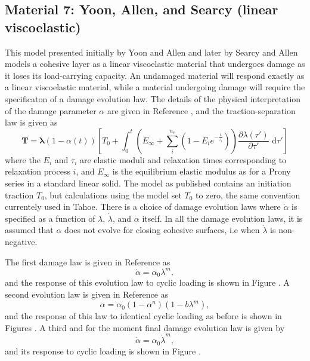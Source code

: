 \subsection{Material 7: Yoon, Allen, and Searcy (linear viscoelastic)}
\label{sect.material.surface.yoon}
This model presented initially by Yoon and Allen and later by
Searcy and Allen models a cohesive layer as a linear viscoelastic material
that undergoes damage as it loses its load-carrying capacity. An undamaged
material will respond exactly as a linear viscoelastic material, while
a material undergoing damage will require the specificaton of a 
damage evolution law. The details of the physical interpretation of 
the damage parameter $\alpha$ are given in Reference \cite{Allen1999}, and 
the traction-separation law is given as
\begin{equation}
\mathbf{T} = \boldsymbol{\lambda} (1-\alpha(t))\left[ T_0 + \int_0^t \left( E_\infty + \sum_i^{n_e} (1-E_i 
e^{-\frac{t}{\tau_i}})\right) \frac{\partial \lambda(\tau')}{\partial \tau'} \mbox{ d}
\tau' \right]
\end{equation}
where the $E_i$ and $\tau_i$ are elastic moduli and relaxation times
corresponding to relaxation process $i$, and $E_\infty$ is the equilibrium
elastic modulus as for a Prony series in a standard linear solid. 
The model as published contains an initiation traction $T_0$, but 
calculations using the model set $T_0$ to zero, the same convention
currentely used in Tahoe. There is a choice of
damage evolution laws where $\dot{\alpha}$ is specified as a function
of $\lambda$, $\dot{\lambda}$, and $\alpha$ itself. In all the damage
evolution laws, it is assumed that $\alpha$ does not evolve for closing
cohesive surfaces, i.e when $\dot{\lambda}$ is non-negative. 

The first damage law is given in Reference \cite{Allen2001} as
\begin{equation}
\dot{\alpha} = \alpha_0 \lambda^m,
\end{equation}
and the response of this evolution law to cyclic loading is shown 
in Figure . A second evolution law is given in Reference \cite{Allen1999} as
\begin{equation}
\dot{\alpha} = \alpha_0 (1-\alpha^n) (1- b \lambda^m),
\end{equation}
and the response of this law to identical cyclic loading as before
is shown in Figures .
A third and for the moment final damage evolution law is given by
\begin{equation}
\dot{\alpha} = \alpha_0 \dot{\lambda}^m,
\end{equation}
and its response to cyclic loading is shown in Figure .

